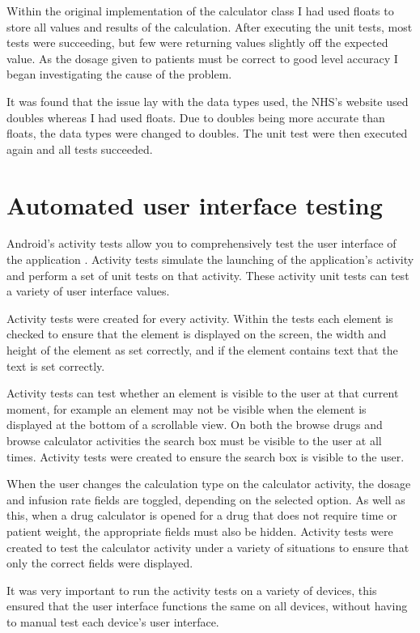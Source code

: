 Within the original implementation of the calculator class I had used floats to store all values and results of the calculation. After executing the unit tests, most tests were succeeding, but few were returning values slightly off the expected value. As the dosage given to patients must be correct to good level accuracy I began investigating the cause of the problem. 

It was found that the issue lay with the data types used, the NHS's website \cite{medusa} used doubles whereas I had used floats. Due to doubles being more accurate than floats, the data types were changed to doubles. The unit test were then executed again and all tests succeeded. 


\section{Automated user interface testing}

Android's activity tests allow you to comprehensively test the user interface of the application \cite{activity_test}. Activity tests simulate the launching of the application's activity \cite{activity_test} and perform a set of unit tests on that activity. These activity unit tests can test a variety of user interface values.

Activity tests were created for every activity. Within the tests each element is checked to ensure that the element is displayed on the screen, the width and height of the element as set correctly, and if the element contains text that the text is set correctly.

Activity tests can test whether an element is visible to the user at that current moment, for example an element may not be visible when the element is displayed at the bottom of a scrollable view. On both the browse drugs and browse calculator activities the search box must be visible to the user at all times. Activity tests were created to ensure the search box is visible to the user.

When the user changes the calculation type on the calculator activity, the dosage and infusion rate fields are toggled, depending on the selected option. As well as this, when a drug calculator is opened for a drug that does not require time or patient weight, the appropriate fields must also be hidden. Activity tests \cite{activity_test} were created to test the calculator activity under a variety of situations to ensure that only the correct fields were displayed.

It was very important to run the activity tests on a variety of devices, this ensured that the user interface functions the same on all devices, without having to manual test each device's user interface.


